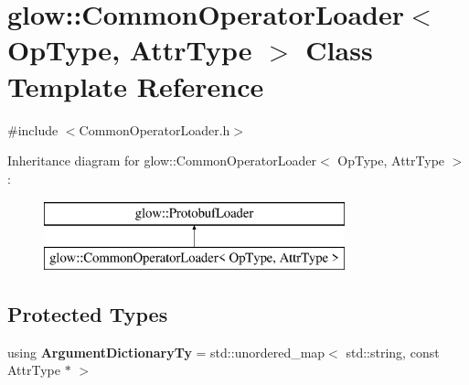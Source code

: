 \hypertarget{classglow_1_1_common_operator_loader}{}\section{glow\+:\+:Common\+Operator\+Loader$<$ Op\+Type, Attr\+Type $>$ Class Template Reference}
\label{classglow_1_1_common_operator_loader}


{\ttfamily \#include $<$Common\+Operator\+Loader.\+h$>$}

Inheritance diagram for glow\+:\+:Common\+Operator\+Loader$<$ Op\+Type, Attr\+Type $>$\+:\begin{figure}[H]
\begin{center}
\leavevmode
\includegraphics[height=2.000000cm]{classglow_1_1_common_operator_loader}
\end{center}
\end{figure}
\subsection*{Protected Types}
\begin{DoxyCompactItemize}
\item 
\mbox{\label{classglow_1_1_common_operator_loader_a5b21493cb6f89151ca8bb1ab4e7673a5}} 
using {\bfseries Argument\+Dictionary\+Ty} = std\+::unordered\+\_\+map$<$ std\+::string, const Attr\+Type $\ast$ $>$
\end{DoxyCompactItemize}
